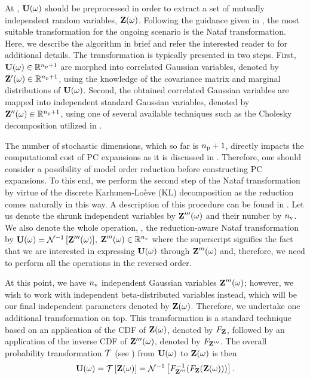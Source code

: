 At , $\mathbf{U}(\omega)$ should be preprocessed in order to extract a set of mutually independent random variables, $\mathbf{Z}(\omega)$.
Following the guidance given in , the most suitable transformation for the ongoing scenario is the Nataf transformation.
Here, we describe the algorithm in brief and refer the interested reader to \cite{li2008} for additional details. The transformation is typically presented in two steps.
First, $\mathbf{U}(\omega) \in \mathbb{R}^{{n_\text{p}} + 1}$ are morphed into correlated Gaussian variables, denoted by $\mathbf{Z}'(\omega) \in \mathbb{R}^{{n_\text{p}} + 1}$, using the knowledge of the covariance matrix and marginal distributions of $\mathbf{U}(\omega)$.
Second, the obtained correlated Gaussian variables are mapped into independent standard Gaussian variables, denoted by $\mathbf{Z}''(\omega) \in \mathbb{R}^{{n_\text{p}} + 1}$, using one of several available techniques such as the Cholesky decomposition \cite{press2007} utilized in \cite{li2008}.

The number of stochastic dimensions, which so far is ${n_\text{p}} + 1$, directly impacts the computational cost of PC expansions as it is discussed in .
Therefore, one should consider a possibility of model order reduction before constructing PC expansions.
To this end, we perform the second step of the Nataf transformation by virtue of the discrete Karhunen-Lo\`{e}ve (KL) decomposition \cite{ghanem1991} as the reduction comes naturally in this way.
A description of this procedure can be found in .
Let us denote the shrunk independent variables by $\mathbf{Z}'''(\omega)$ and their number by ${n_\text{v}}$.
We also denote the whole operation, \ie, the reduction-aware Nataf transformation by $\mathbf{U}(\omega) = \mathcal{N}^{-1}\left[\mathbf{Z}'''(\omega)\right]$, $\mathbf{Z}'''(\omega) \in \mathbb{R}^{n_\text{v}}$ where the superscript signifies the fact that we are interested in expressing $\mathbf{U}(\omega)$ through $\mathbf{Z}'''(\omega)$ and, therefore, we need to perform all the operations in the reversed order.

At this point, we have ${n_\text{v}}$ independent Gaussian variables $\mathbf{Z}'''(\omega)$; however, we wish to work with independent beta-distributed variables instead, which will be our final independent parameters denoted by $\mathbf{Z}(\omega)$.
Therefore, we undertake one additional transformation on top.
This transformation is a standard technique \cite{durrett2010} based on an application of the CDF of $\mathbf{Z}(\omega)$, denoted by $F_{\mathbf{Z}}$, followed by an application of the inverse CDF of $\mathbf{Z}'''(\omega)$, denoted by $F_{\mathbf{Z}'''}$.
The overall probability transformation $\oTransform$ (see ) from $\mathbf{U}(\omega)$ to $\mathbf{Z}(\omega)$ is then
\[
  \vU(\o) = \oTransform{\vZ(\o)} = \oInvNataf{\CDF^{-1}_{\vZ'''}(\CDF_{\vZ}(\vZ(\o)))}.
\]
